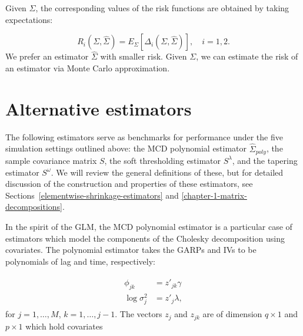 \bigskip

Given $\Sigma$, the corresponding values of the risk functions are obtained by taking expectations:

\begin{equation*}
R_i \left(\Sigma,\hat{\Sigma}\right) = E_\Sigma\left[\Delta_i\left(\Sigma,\hat{\Sigma}\right)\right], \quad i = 1,2.
\end{equation*}
\noindent
We prefer an estimator $\hat{\Sigma}$ with smaller risk.  Given $\Sigma$, we can estimate the risk of an estimator via Monte Carlo approximation. 


\section{Alternative estimators}
%
The following estimators serve as benchmarks for performance under the five simulation settings outlined above: the MCD polynomial estimator $\hat{\Sigma}_{poly}$, the sample covariance matrix $S$, the soft thresholding estimator $S^\lambda$, and the tapering estimator $S^\omega$. We will review the general definitions of these, but for detailed discussion of the construction and properties of these estimators, see Sections~\ref{elementwise-shrinkage-estimators} and \ref{chapter-1-matrix-decompositions}.

\bigskip

In the spirit of the GLM, the MCD polynomial estimator is a particular case of estimators which model the components of the Cholesky decomposition using covariates. The polynomial estimator takes the GARPs and IVs to be polynomials of lag and time, respectively:

\begin{align*}
\begin{split}  \label{eq:GARP-IV-parametric-model}
\phi_{jk} &= z'_{jk} \gamma \\
\log \sigma^2_{j} &= z'_{j}\lambda, 
\end{split}
\end{align*}
\noindent
for $j = 1,\dots, M$, $k = 1,\dots, j-1$. The vectors $z_j$ and $z_{jk}$ are of dimension $q \times 1$ and $p \times 1$  which hold covariates

